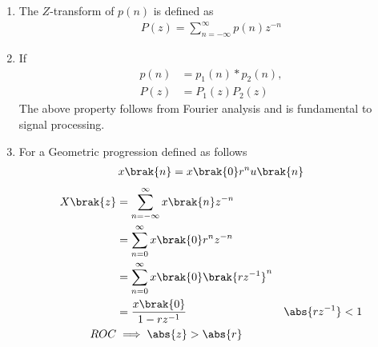 \begin{enumerate}[label=\thechapter.\arabic*,ref=\thechapter.\theenumi]
\item 
	The $Z$-transform of $p(n)$ is defined as
\begin{align}
P(z) = \sum_{n=-\infty}^{\infty}p(n)z^{-n}
\label{eq:ztrans}
\end{align}
\item If 
\begin{align}
	p(n) &= p_1(n)* p_2(n),
	\\
	P(z)&=P_1(z)P_2(z)
\end{align}
The above property follows from Fourier analysis and is fundamental to signal processing. 
\item For a Geometric progression defined as follows
\begin{align}
	 x\brak{n} =x\brak{0}r^nu\brak{n}
\end{align}  
\begin{align}
               X\brak{z} &= \sum_{n=-\infty}^{\infty}x\brak{n}z^{-n}\\
               &=\sum_{n=0}^{\infty}x\brak{0}r^nz^{-n}\\
                &=\sum_{n=0}^{\infty}x\brak{0}\brak{rz^{-1}}^n\\
               &= \frac{x\brak{0}}{1-rz^{-1}} & \abs{rz^{-1}}<1\\ 
               ROC &\implies \abs{z}>\abs{r} 
\end{align}
\end{enumerate}
